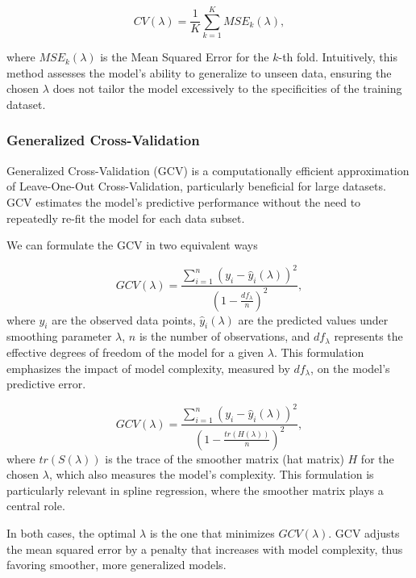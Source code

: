 \documentclass[12pt, twoside,hidelinks]{article}
\theoremstyle{definition}
\numberwithin{equation}{section}
\begin{document}
\begin{equation}
    CV(\lambda) = \frac{1}{K} \sum_{k=1}^{K} MSE_k(\lambda),
    \label{eq:K_fold_CV}
\end{equation}

where \(MSE_k(\lambda)\) is the Mean Squared Error for the \(k\)-th fold. Intuitively, this method assesses the model's ability to generalize to unseen data, ensuring the chosen \(\lambda\) does not tailor the model excessively to the specificities of the training dataset.

\subsubsection{Generalized Cross-Validation}
Generalized Cross-Validation (GCV) is a computationally efficient approximation of Leave-One-Out Cross-Validation, particularly beneficial for large datasets. GCV estimates the model's predictive performance without the need to repeatedly re-fit the model for each data subset. 

We can formulate the GCV in two equivalent ways

\begin{equation}
    GCV(\lambda) = \frac{\sum_{i=1}^{n} (y_i - \hat{y}_i(\lambda))^2}{(1 - \frac{df_{\lambda}}{n})^2},
    \label{GCV1}
\end{equation}
where \(y_i\) are the observed data points, \(\hat{y}_i(\lambda)\) are the predicted values under smoothing parameter \(\lambda\), \(n\) is the number of observations, and \(df_{\lambda}\) represents the effective degrees of freedom of the model for a given \(\lambda\). This formulation emphasizes the impact of model complexity, measured by \(df_{\lambda}\), on the model's predictive error.

\begin{equation}
    GCV(\lambda) = \frac{\sum_{i=1}^{n} (y_i - \hat{y}_i(\lambda))^2}{(1 - \frac{tr(H(\lambda))}{n})^2},
    \label{GCV2}
\end{equation}
where \(tr(S(\lambda))\) is the trace of the smoother matrix (hat matrix) \(H\) for the chosen \(\lambda\), which also measures the model's complexity. This formulation is particularly relevant in spline regression, where the smoother matrix plays a central role.

In both cases, the optimal \(\lambda\) is the one that minimizes \(GCV(\lambda)\). GCV adjusts the mean squared error by a penalty that increases with model complexity, thus favoring smoother, more generalized models.
\newline
\end{document}
